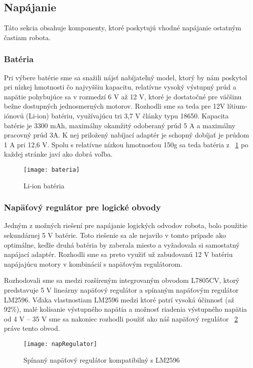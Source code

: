 \subsection{Napájanie}
Táto sekcia obsahuje komponenty, ktoré poskytujú vhodné napájanie ostatným častiam robota.
\subsubsection{Batéria}
Pri výbere batérie sme sa snažili nájsť nabíjateľný model, ktorý by nám poskytol pri nízkej hmotnosti čo najvyššiu kapacitu, relatívne vysoký výstupný prúd a napätie pohybujúce sa v rozmedzí 6 V až 12 V, ktoré je dostatočné pre väčšinu bežne dostupných jednosmerných motorov. Rozhodli sme sa teda pre 12V lítium-iónovú (Li-ion) batériu, využívajúcu tri 3,7 V články typu 18650. Kapacita batérie je 3300 mAh, maximálny okamžitý odoberaný prúd 5 A a maximálny pracovný prúd 3A. K nej priložený nabíjací adaptér je schopný dobíjať je prúdom 1 A pri 12,6 V. Spolu s relatívne nízkou hmotnosťou 150g sa teda batéria z \figurename~\ref{fig:bateria} po každej stránke javí ako dobrá voľba. 

\begin{figure}
\centering
\texttt{[image: bateria]}
\caption{Li-ion batéria}
\label{fig:bateria}
\end{figure}

\subsubsection{Napäťový regulátor pre logické obvody}
Jedným z možných riešení pre napájanie logických odvodov robota, bolo použitie sekundárnej 5 V batérie. Toto riešenie sa ale nejavilo v tomto prípade ako optimálne, keďže druhá batéria by zaberala miesto a vyžadovala si samostatný napájací adaptér. Rozhodli sme sa preto využiť už zabudovanú 12 V batériu napájajúcu motory v kombinácií s napäťovým regulátorom. 

Rozhodovali sme sa medzi rozšíreným integrovaným obvodom L7805CV, ktorý predstavuje 5 V lineárny napäťový regulátor a spínaným napäťovým regulátor LM2596. Vďaka vlastnostiam LM2596 medzi ktoré patrí vysoká účinnosť (až 92\%), malé kolísanie výstupného napätia a možnosť riadenia výstupného napätia od 4 V – 35 V sme sa nakoniec rozhodli použiť ako náš napäťový regulátor \figurename~\ref{fig:napRegulator} práve tento obvod.

\begin{figure}
\centering
\texttt{[image: napRegulator]}
\caption{Spínaný napäťový regulátor kompatibilný s LM2596}
\label{fig:napRegulator}
\end{figure}

